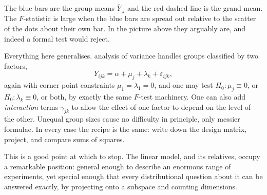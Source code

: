\documentclass[a4paper]{scrartcl}
\begin{document}
\begin{center}
\end{center}

The blue bars are the group means $\overline{Y}_{\cdot j}$ and the red dashed line is the grand mean. The $F$-statistic is large when the blue bars are spread out relative to the scatter of the dots about their own bar. In the picture above they arguably are, and indeed a formal test would reject.

\begin{remark}
  Everything here generalises.  analysis of variance handles groups classified by two factors,
  $$
  Y_{ijk} = \alpha + \mu_j + \lambda_k + \varepsilon_{ijk},
  $$
  again with corner point constraints $\mu_1 = \lambda_1 = 0$, and one may test $H_0 : \mu_j \equiv 0$, or $H_0 : \lambda_k \equiv 0$, or both, by exactly the same $F$-test machinery. One can also add \emph{interaction} terms $\gamma_{jk}$ to allow the effect of one factor to depend on the level of the other. Unequal group sizes cause no difficulty in principle, only messier formulae. In every case the recipe is the same: write down the design matrix, project, and compare sums of squares.
\end{remark}

This is a good point at which to stop. The linear model, and its relatives, occupy a remarkable position: general enough to describe an enormous range of experiments, yet special enough that every distributional question about it can be answered exactly, by projecting onto a subspace and counting dimensions.
\end{document}

